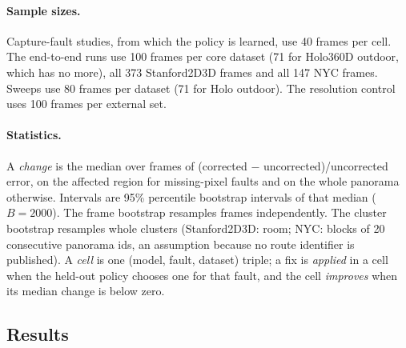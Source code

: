 \documentclass{article}
\begin{document}
\paragraph{Sample sizes.} Capture-fault studies, from which the policy is learned, use 40 frames per cell. The end-to-end runs use 100 frames per core dataset (71 for Holo360D outdoor, which has no more), all 373 Stanford2D3D frames and all 147 NYC frames. Sweeps use 80 frames per dataset (71 for Holo outdoor). The resolution control uses 100 frames per external set.
\paragraph{Statistics.} A \emph{change} is the median over frames of (corrected $-$ uncorrected)/uncorrected error, on the affected region for missing-pixel faults and on the whole panorama otherwise. Intervals are 95\% percentile bootstrap intervals of that median ($B=2000$). The frame bootstrap resamples frames independently. The cluster bootstrap resamples whole clusters (Stanford2D3D: room; NYC: blocks of 20 consecutive panorama ids, an assumption because no route identifier is published). A \emph{cell} is one (model, fault, dataset) triple; a fix is \emph{applied} in a cell when the held-out policy chooses one for that fault, and the cell \emph{improves} when its median change is below zero.

\subsection{Results}
\end{document}
